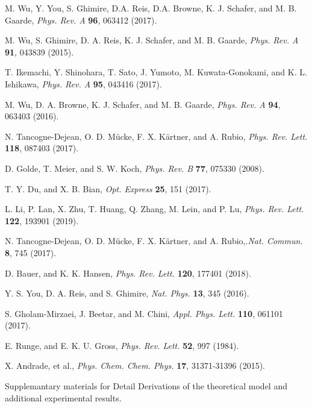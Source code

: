 \documentclass[aps,prl,10pt,preprint,nofootinbib]{revtex4-1}
\begin{document}
\begin{thebibliography}{99}
 M. Wu, Y. You, S. Ghimire, D.A. Reis, D.A. Browne, K. J. Schafer, and M. B. Gaarde, {\it Phys. Rev. A} \textbf{96}, 063412 (2017).

 M. Wu, S. Ghimire, D. A. Reis, K. J. Schafer, and M. B. Gaarde, {\it Phys. Rev. A} \textbf{91}, 043839 (2015).

 T. Ikemachi, Y. Shinohara, T. Sato, J. Yumoto, M. Kuwata-Gonokami, and K. L. Ishikawa, {\it Phys. Rev. A} \textbf{95}, 043416 (2017).	

 M. Wu, D. A. Browne, K. J. Schafer, and M. B. Gaarde, {\it Phys. Rev. A} \textbf{94}, 063403 (2016).

 N. Tancogne-Dejean, O. D. M\"{u}cke, F. X. K\"{a}rtner, and A. Rubio, {\it Phys. Rev. Lett.} \textbf{118}, 087403 (2017).

 D. Golde, T. Meier, and S. W. Koch, {\it Phys. Rev. B} \textbf{77}, 075330 (2008).

 T. Y. Du, and X. B. Bian, {\it Opt. Express} \textbf{25}, 151 (2017).

 L. Li, P. Lan, X. Zhu, T. Huang, Q. Zhang, M. Lein, and P. Lu, {\it Phys. Rev. Lett.} \textbf{122}, 193901 (2019).

  N. Tancogne-Dejean, O. D. M\"{u}cke, F. X. K\"{a}rtner, and A. Rubio,.{\it Nat. Commun.} \textbf{8}, 745 (2017).

 D. Bauer, and K. K. Hansen, {\it Phys. Rev. Lett.} \textbf{120}, 177401 (2018).

 Y. S. You, D. A. Reis, and S. Ghimire, {\it Nat. Phys.} \textbf{13}, 345 (2016).

 S. Gholam-Mirzaei, J. Beetar, and M. Chini, {\it Appl. Phys. Lett.} \textbf{110}, 061101 (2017).

 E. Runge, and E. K. U. Gross, {\it Phys. Rev. Lett.} \textbf{52}, 997 (1984).

 X. Andrade, et al., \textit{Phys. Chem. Chem. Phys.} \textbf{17}, 31371-31396 (2015).

 Supplemantary materials for Detail Derivations of the theoretical model and additional experimental results.

\end{thebibliography}
\end{document}
